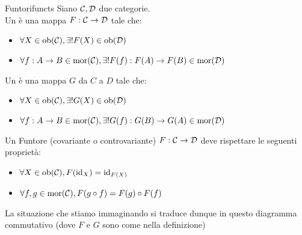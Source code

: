 \documentclass{article}
\begin{document}
\begin{definition}{Funtori}{functs}
    Siano $\mathcal{C}, \mathcal{D}$ due categorie.\\
    Un  è una mappa $F: \mathcal{C}\to\mathcal{D}$ tale che:\begin{itemize}
        \item $\forall X \in \operatorname{ob}(\mathcal{C}), \exists! F(X)\in \operatorname{ob}(\mathcal{D})$
        \item $\forall f:A\to B \in \operatorname{mor}(\mathcal{C}), \exists! F(f):F(A)\to F(B) \in \operatorname{mor}(\mathcal{D})$
    \end{itemize}
    Un  è una mappa $G$ da $C$ a $D$ tale che:\begin{itemize}
        \item $\forall X \in \operatorname{ob}(\mathcal{C}), \exists! G(X)\in \operatorname{ob}(\mathcal{D})$
        \item $\forall f:A\to B \in \operatorname{mor}(\mathcal{C}), \exists! G(f):G(B)\to G(A) \in \operatorname{mor}(\mathcal{D})$
    \end{itemize}
    Un Funtore (covariante o controvariante) $F:\mathcal{C}\to \mathcal{D}$ deve rispettare le seguenti proprietà:\begin{itemize}
        \item $\forall X \in \operatorname{ob}(\mathcal{C}), F(\operatorname{id}_{X}) = \operatorname{id}_{F(X)}$
        \item $\forall f,g \in \operatorname{mor}(\mathcal{C}),F(g\circ f) = F(g) \circ F(f)$
    \end{itemize}
\end{definition}

La situazione che stiamo immaginando si traduce dunque in questo diagramma commutativo (dove $F$ e $G$ sono come nella definizione)
\end{document}
